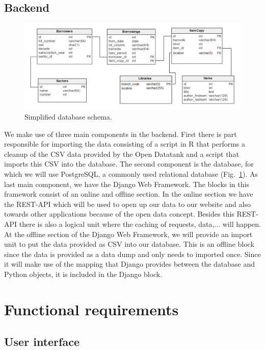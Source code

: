 \subsection{Backend}
\begin{figure}[h!]
	\centering
	\includegraphics[width=16cm]{fig/db}
	\caption{Simplified database schema.}
	\label{fig:db}
\end{figure}

We make use of three main components in the backend.
First there is part responsible for importing the data consisting of a script in R that performs a cleanup of the CSV data provided by the Open Datatank and a script that imports this CSV into the database. The second component is the database, for which we will use PostgreSQL, a commonly used relational database  (Fig.~\ref{fig:db}). As last main component, we have the Django Web Framework. The blocks in this framework consist of an online and offline section. In the online section we have the REST-API which will be used to open up our data to our website and also towards other applications because of the open data concept. Besides this REST-API there is also a logical unit where the caching of requests, data,... will happen. At the offline section of the Django Web Framework, we will provide an import unit to put the data provided as CSV into our database. This is an offline block since the data is provided as a data dump and only needs to imported once. Since it will make use of the mapping that Django provides between the database and Python objects, it is included in the Django block.\\




\section{Functional requirements}

\subsection{User interface}

